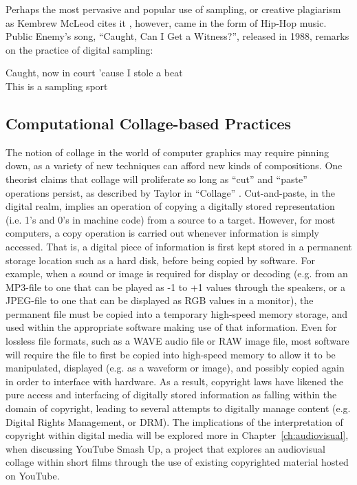 \documentclass[a4paper,10pt,final]{ThesisStyle}
\begin{document}
Perhaps the most pervasive and popular use of sampling, or creative plagiarism as Kembrew McLeod cites it \cite{McLeod2011}, however, came in the form of Hip-Hop music.  Public Enemy's song, ``Caught, Can I Get a Witness?'', released in 1988, remarks on the practice of digital sampling: 
\begin{verseb}
Caught, now in court 'cause I stole a beat\\
This is a sampling sport
\end{verseb}




\subsection{Computational Collage-based Practices}


The notion of collage in the world of computer graphics may require pinning down, as a variety of new techniques can afford new kinds of compositions.  One theorist claims that collage will proliferate so long as ``cut'' and ``paste'' operations persist, as described by Taylor in ``Collage'' \cite{Taylor2006b}.   Cut-and-paste, in the digital realm, implies an operation of copying a digitally stored representation (i.e. 1's and 0's in machine code) from a source to a target.  However, for most computers, a copy operation is carried out whenever information is simply accessed.  That is, a digital piece of information is first kept stored in a permanent storage location such as a hard disk, before being copied by software.  For example, when a sound or image is required for display or decoding (e.g. from an MP3-file to one that can be played as -1 to +1 values through the speakers, or a JPEG-file to one that can be displayed as RGB values in a monitor), the permanent file must be copied into a temporary high-speed memory storage, and used within the appropriate software making use of that information.  Even for lossless file formats, such as a WAVE audio file or RAW image file, most software will require the file to first be copied into high-speed memory to allow it to be manipulated, displayed (e.g. as a waveform or image), and possibly copied again in order to interface with hardware.  As a result, copyright laws have likened the pure access and interfacing of digitally stored information as falling within the domain of copyright, leading to several attempts to digitally manage content (e.g. Digital Rights Management, or DRM).  The implications of the interpretation of copyright within digital media will be explored more in Chapter~\ref{ch:audiovisual}, when discussing YouTube Smash Up, a project that explores an audiovisual collage within short films through the use of existing copyrighted material hosted on YouTube.  
\end{document}
